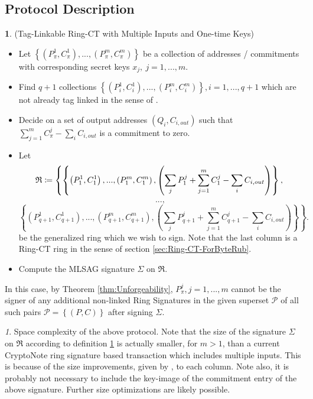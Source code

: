 \documentclass[12pt,oneside,english]{amsart}
\numberwithin{equation}{section}
\numberwithin{figure}{section}
\theoremstyle{plain}
\theoremstyle{plain}
\theoremstyle{remark}
\newtheorem{rem}[thm]{\protect\remarkname}
\theoremstyle{plain}
\theoremstyle{remark}
\theoremstyle{remark}
\theoremstyle{plain}
\theoremstyle{definition}
\newtheorem{defn}[thm]{\protect\definitionname}
\providecommand{\definitionname}{Definition}
\providecommand{\remarkname}{Remark}
\begin{document}
\subsection{Protocol Description}
\begin{defn}
\label{RCTProtocol}(Tag-Linkable Ring-CT with
Multiple Inputs and One-time Keys) \end{defn}
\begin{itemize}
\item Let $\left\{ \left(P_{\pi}^{1},C_{\pi}^{1}\right),...,\left(P_{\pi}^{m},C_{\pi}^{m}\right)\right\} $
be a collection of addresses / commitments with corresponding secret
keys $x_{j},\ j=1,...,m$. 
\item Find $q+1$ collections $\left\{ \left(P_{i}^{1},C_{i}^{1}\right),...,\left(P_{i}^{m},C_{i}^{m}\right)\right\} ,i=1,...,q+1$
which are not already tag linked in the sense of \cite[page 6]{FS}. 
\item Decide on a set of output addresses $\left(Q_{i},C_{i,out}\right)$
such that $\sum_{j=1}^{m}C_{\pi}^{j}-\sum_{i}C_{i,out}$ is a commitment
to zero. 
\item Let 
\[
\mbox{\ensuremath{\mathfrak{R}}}\coloneqq\left\{ \left\{ \left(P_{1}^{1},C_{1}^{1}\right),...,\left(P_{1}^{m},C_{1}^{m}\right),\left(\sum_{j}P_{1}^{j}+\sum_{j=1}^{m}C_{1}^{j}-\sum_{i}C_{i,out}\right)\right\} ,\right.
\]
\[
...,
\]
\[
\left.\left\{ \left(P_{q+1}^{1},C_{q+1}^{1}\right),...,\left(P_{q+1}^{m},C_{q+1}^{m}\right),\left(\sum_{j}P_{q+1}^{j}+\sum_{j=1}^{m}C_{q+1}^{j}-\sum_{i}C_{i,out}\right)\right\} \right\} .
\]
 be the generalized ring which we wish to sign. Note that the last
column is a Ring-CT ring in the sense of section \ref{sec:Ring-CT-ForByteRub}. 
\item Compute the MLSAG signature $\Sigma$ on $\mathfrak{R}.$
\end{itemize}
In this case, by Theorem \ref{thm:Unforgeability}, $P_{\pi}^{j},j=1,...,m$ cannot be the signer of any
additional non-linked Ring Signatures in the given superset $\mathcal{P}$
of all such pairs $\mathcal{P}=\left\{ \left(P,C\right)\right\} $
after signing $\Sigma$. 
\begin{rem}
Space complexity of the above protocol. Note that the size of the
signature $\Sigma$ on $\mathfrak{R}$ according to definition \ref{RCTProtocol}
is actually smaller, for $m>1$, than a current CryptoNote \cite{CN}
ring signature based transaction which includes multiple inputs. This
is because of the size improvements, given by \cite{LWW}, to each
column. Note also, it is probably not necessary to include the key-image
of the commitment entry of the above signature. Further size optimizations
are likely possible.\end{rem}
\end{document}
